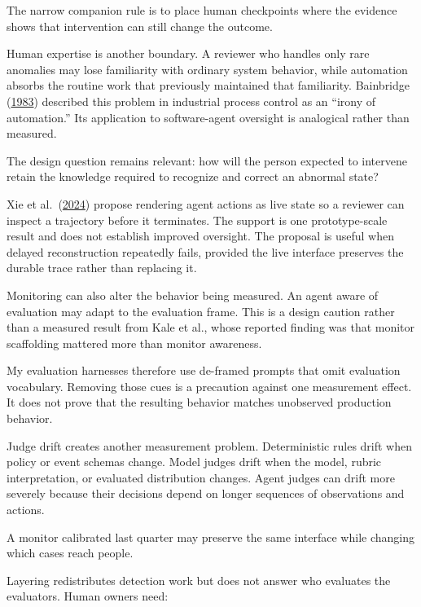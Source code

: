 The narrow companion rule is to place human checkpoints where the evidence shows that intervention can still change the outcome.

Human expertise is another boundary. A reviewer who handles only rare anomalies may lose familiarity with ordinary system behavior, while automation absorbs the routine work that previously maintained that familiarity. Bainbridge (\href{https://doi.org/10.1016/0005-1098(83)90046-8}{1983}) described this problem in industrial process control as an ``irony of automation.'' Its application to software-agent oversight is analogical rather than measured.

The design question remains relevant: how will the person expected to intervene retain the knowledge required to recognize and correct an abnormal state?

Xie et al.~(\href{https://arxiv.org/abs/2408.01703}{2024}) propose rendering agent actions as live state so a reviewer can inspect a trajectory before it terminates. The support is one prototype-scale result and does not establish improved oversight. The proposal is useful when delayed reconstruction repeatedly fails, provided the live interface preserves the durable trace rather than replacing it.

Monitoring can also alter the behavior being measured. An agent aware of evaluation may adapt to the evaluation frame. This is a design caution rather than a measured result from Kale et al., whose reported finding was that monitor scaffolding mattered more than monitor awareness.

My evaluation harnesses therefore use de-framed prompts that omit evaluation vocabulary. Removing those cues is a precaution against one measurement effect. It does not prove that the resulting behavior matches unobserved production behavior.

Judge drift creates another measurement problem. Deterministic rules drift when policy or event schemas change. Model judges drift when the model, rubric interpretation, or evaluated distribution changes. Agent judges can drift more severely because their decisions depend on longer sequences of observations and actions.

A monitor calibrated last quarter may preserve the same interface while changing which cases reach people.


Layering redistributes detection work but does not answer who evaluates the evaluators. Human owners need:

